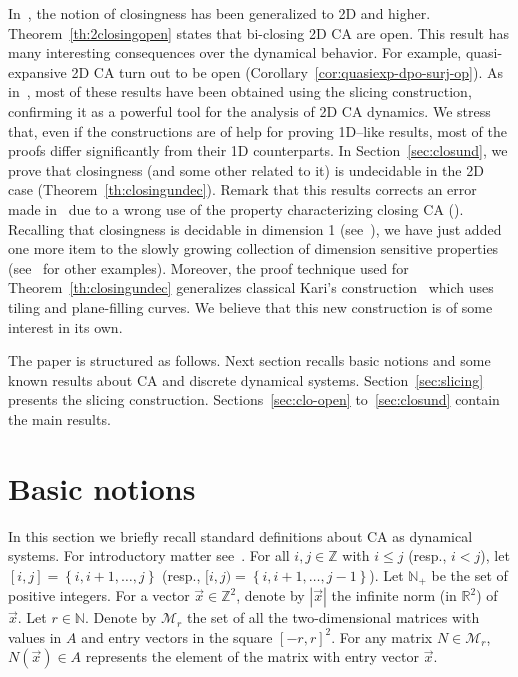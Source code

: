 \documentclass{llncs}
\newcommand{\z}{\ensuremath{\mathbb{Z}}\xspace}
\newcommand{\n}{\ensuremath{\mathbb{N}}\xspace}
\newcommand{\re}{\mathbb{R}}
\newcommand{\zdu}{\ensuremath{\mathbb{Z}^2}\xspace}
\newcommand{\set}[1]{\left\{#1\right\}}
\newcommand{\xx}{\vec x}
\newcommand{\Mr}{\ensuremath{\mathcal{M}_r}\xspace}
\begin{document}
In~\cite{dennunzio08}, the notion of closingness has been generalized to 2D and higher. Theorem~\ref{th:2closingopen} states that
bi-closing 2D CA are open. This result has many interesting consequences over the dynamical behavior. For example, quasi-expansive 2D CA turn out to be open 
(Corollary~\ref{cor:quasiexp-dpo-surj-op}). As in~\cite{dennunzio08}, most of these results have been obtained
using the slicing construction, confirming it as a powerful tool for the analysis of 2D CA dynamics. We stress that, even if the constructions are of help for
proving 1D--like results, most of the proofs differ significantly from their 1D
counterparts.
In Section~\ref{sec:closund}, we prove that closingness (and some other related to it) is undecidable in the 2D case (Theorem~\ref{th:closingundec}). Remark that this results corrects an error
made in~\cite[Prop. $2$]{dennunzio08} due to a wrong use of the property characterizing closing CA (\cite[Prop. $1$]{dennunzio08}). Recalling that closingness is decidable in
dimension 1 (see~\cite{kurka04}), we have just added one more
item to the slowly growing collection of dimension sensitive properties
(see~\cite{kari94a,bernardi05} for other examples). 
Moreover, the proof technique used for Theorem~\ref{th:closingundec}
generalizes classical Kari's construction~\cite{kari94a} which uses tiling and plane-filling curves. We believe that this new construction is of some interest in its own.
\smallskip

The paper is structured as follows. Next section recalls basic notions and some known results about CA and discrete dynamical systems.
Section~\ref{sec:slicing} presents the slicing construction. 
Sections~\ref{sec:clo-open} to~\ref{sec:closund} contain the main results.






\section{Basic notions}
In this section we briefly recall standard definitions about CA as
dynamical systems. For introductory matter see~\cite{kurka04}.
For all $i,j\in\z$ with $i\leq j$ (resp., $i<j$), let
$[i,j]=\set{i,i+1,\ldots,j}$ (resp., $[i,j)=\set{i,i+1,\ldots,j-1}$). 
Let $\n_+$ be the set of positive
integers. For a vector $\xx\in\zdu$, denote by $|\xx|$ the
infinite norm (in $\re^2$) of $\xx$. Let $r\in\n$. Denote by $\Mr$
the set of all the two-dimensional matrices with values in $A$ and
entry vectors in the square $[-r,r]^2$. For any matrix $N\in\Mr$,
$N(\xx)\in A$ represents the element of the matrix with entry
vector $\xx$.
\end{document}
